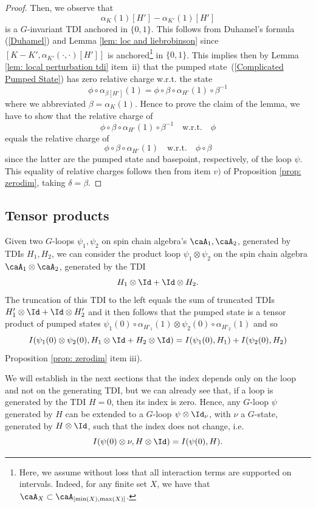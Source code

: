 \begin{proof}
	Then, we observe that 
	$$
	\alpha_{K}(1)[H']-\alpha_{K'}(1)[H']
	$$
	is a $G$-invariant TDI anchored in $\{0,1\}$. This follows from Duhamel's formula (\ref{Duhamel}) and Lemma \ref{lem: loc and liebrobinson} since $[K-K',\alpha_{K'}(\cdot,\cdot)[H']]$ is anchored\footnote{Here, we assume without loss that all interaction terms are supported on intervals. Indeed, for any finite set $X$, we have that $\caA_X\subset\caA_{[\min(X),\max(X)]}$.} in $\{0,1\}$. This implies then by Lemma \ref{lem: local perturbation tdi} item~ii) that the pumped state~(\ref{Complicated Pumped State}) has zero relative charge w.r.t. the state
	$$
	\phi \circ \alpha_{\beta[H']}(1)= \phi \circ \beta \circ \alpha_{H'}(1) \circ \beta^{-1}
	$$
	where we abbreviated $\beta=\alpha_{K}(1)$. 
	Hence to prove the claim of the lemma, we have to show that the relative charge of 
	$$
	\phi\circ \beta \circ \alpha_{H'}(1)\circ \beta^{-1}  \quad \text{w.r.t.}\quad \phi
	$$
	equals the relative charge of 
	$$
	\phi\circ \beta \circ \alpha_{H'}(1)  \quad \text{w.r.t.}\quad \phi\circ \beta
	$$
	since the latter are the pumped state and basepoint, respectively, of the loop $\psi$.
	This equality of relative charges follows then from item $v)$ of Proposition \ref{prop: zerodim}, taking $\delta=\beta$.
\end{proof}


\subsection{Tensor products}\label{sec: tensor products}

Given two $G$-loops $\psi_1,\psi_2$ on spin chain algebra's $\caA_1,\caA_2$, generated by TDIs $H_1,H_2$, we can consider the product loop 
$
\psi_1 \otimes\psi_2
$
on the spin chain algebra $\caA_1\otimes\caA_2$,
generated by the TDI
$$
H_1\otimes \Id +\Id \otimes H_2.
$$
The truncation of this TDI to the left equals the sum of truncated TDIs $H'_1\otimes \Id + \Id \otimes H'_2$ and it then follows that the pumped state is a tensor product of pumped states 
$
\psi_1(0) \circ\alpha_{H'_1}(1) \otimes \psi_2(0) \circ\alpha_{H'_2}(1)
$ and so
$$
I(\psi_1(0) \otimes \psi_2(0),H_1\otimes \Id +H_2\otimes \Id ) =
I(\psi_1(0),H_1 ) + I(\psi_2(0),H_2) 
$$
Proposition \ref{prop: zerodim} item iii).

We will establish in the next sections that the index depends only on the loop and not on the generating TDI, but we can already see that, if a loop is generated by the TDI $H=0$, then its index is zero. Hence, any $G$-loop $\psi$  generated by $H$ can be extended to a $G$-loop  $\psi\otimes \Id_\nu$, with $\nu$ a $G$-state, generated by $H\otimes\Id$, such that the index does not change, i.e.\
\begin{equation} \label{eq: index adjoining constant loop}
	I(\psi(0)\otimes\nu,H\otimes \Id)=I(\psi(0) ,H).
\end{equation}

